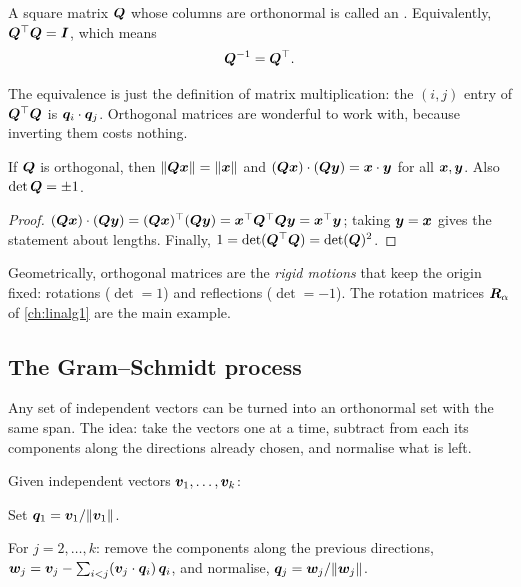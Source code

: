 \begin{definition}\label{def:orthogonal-matrix}
A square matrix $\bm{Q}$ whose columns are orthonormal is called an
. Equivalently, $\bm{Q}^\top\bm{Q} = \bm{I}$, which means
\[
  \bm{Q}^{-1} = \bm{Q}^\top .
\]
\end{definition}

The equivalence is just the definition of matrix multiplication: the $(i,j)$
entry of $\bm{Q}^\top\bm{Q}$ is $\bm{q}_i\cdot\bm{q}_j$. Orthogonal matrices are wonderful to
work with, because inverting them costs nothing.

\begin{theorem}
\label{thm:orthogonal-preserve}
If $\bm{Q}$ is orthogonal, then $\lVert\bm{Q}\bm{x}\rVert = \lVert\bm{x}\rVert$ and
$(\bm{Q}\bm{x})\cdot(\bm{Q}\bm{y}) = \bm{x}\cdot\bm{y}$ for all $\bm{x}, \bm{y}$. Also
$\det\bm{Q} = \pm1$.
\end{theorem}

\begin{proof}
$(\bm{Q}\bm{x})\cdot(\bm{Q}\bm{y}) = (\bm{Q}\bm{x})^\top(\bm{Q}\bm{y}) = \bm{x}^\top\bm{Q}^\top\bm{Q}\bm{y} =
\bm{x}^\top\bm{y}$; taking $\bm{y} = \bm{x}$ gives the statement about lengths. Finally,
$1 = \det(\bm{Q}^\top\bm{Q}) = \det(\bm{Q})^2$.
\end{proof}

Geometrically, orthogonal matrices are the \emph{rigid motions} that keep the
origin fixed: rotations ($\det = 1$) and reflections ($\det = -1$). The
rotation matrices $\bm{R}_\alpha$ of \cref{ch:linalg1} are the main example.

\subsection{The Gram--Schmidt process}

Any set of independent vectors can be turned into an orthonormal set with the
same span. The idea: take the vectors one at a time, subtract from each its
components along the directions already chosen, and normalise what is left.

\begin{algorithm}\label{alg:gram-schmidt}
Given independent vectors $\bm{v}_1, \dots, \bm{v}_k$:
\begin{steps}
  \item Set $\bm{q}_1 = \bm{v}_1/\lVert\bm{v}_1\rVert$.
  \item For $j = 2, \dots, k$: remove the components along the previous
    directions, $\bm{w}_j = \bm{v}_j - \sum_{i<j} (\bm{v}_j\cdot\bm{q}_i)\,\bm{q}_i$, and
    normalise, $\bm{q}_j = \bm{w}_j/\lVert\bm{w}_j\rVert$.
\end{steps}
\end{algorithm}

